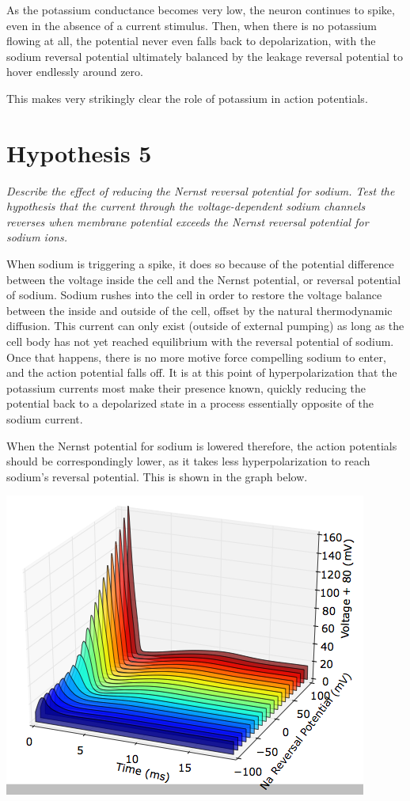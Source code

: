 \documentclass[12pt]{article}
\begin{document}
As the potassium conductance becomes very low, the neuron continues to spike, even in the absence of a current stimulus.  Then, when there is no potassium flowing at all, the potential never even falls back to depolarization, with the sodium reversal potential ultimately balanced by the leakage reversal potential to hover endlessly around zero.  

This makes very strikingly clear the role of potassium in action potentials.

\section{Hypothesis 5}

\emph{Describe the effect of reducing the Nernst reversal potential for sodium.  Test the hypothesis that the current through the voltage-dependent sodium channels reverses when membrane potential exceeds the Nernst reversal potential for sodium ions.}

\vspace{10pt}

When sodium is triggering a spike, it does so because of the potential difference between the voltage inside the cell and the Nernst potential, or reversal potential of sodium.  Sodium rushes into the cell in order to restore the voltage balance between the inside and outside of the cell, offset by the natural thermodynamic diffusion.  This current can only exist (outside of external pumping) as long as the cell body has not yet reached equilibrium with the reversal potential of sodium.  Once that happens, there is no more motive force compelling sodium to enter, and the action potential falls off.  It is at this point of hyperpolarization that the potassium currents most make their presence known, quickly reducing the potential back to a depolarized state in a process essentially opposite of the sodium current.  

When the Nernst potential for sodium is lowered therefore, the action potentials should be correspondingly lower, as it takes less hyperpolarization to reach sodium's reversal potential.  This is shown in the graph below.

\includegraphics[scale=0.5]{nareversal.png}
\end{document}
